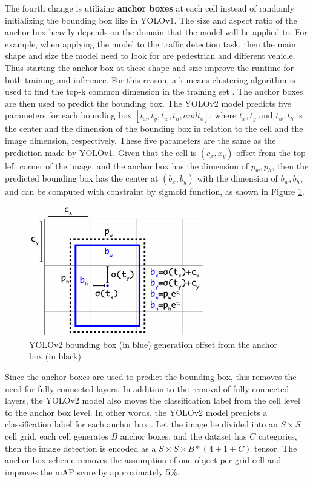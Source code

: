 The fourth change is utilizing \textbf{anchor boxes} at each cell instead of randomly initializing the bounding box like in YOLOv1. The size and aspect ratio of the anchor box heavily depends on the domain that the model will be applied to. For example, when applying the model to the traffic detection task, then the main shape and size the model need to look for are pedestrian and different vehicle. Thus starting the anchor box at these shape and size improve the runtime for both training and inference. For this reason, a k-means clustering algorithm is used to find the top-k common dimension in the training set \cite{yolo9000_2017}. The anchor boxes are then used to predict the bounding box. The YOLOv2 model predicts five parameters for each bounding box $[t_x, t_y, t_w, t_h, and t_o]$, where $t_x, t_y$ and $t_w, t_h$ is the center and the dimension of the bounding box in relation to the cell and the image dimension, respectively. These five parameters are the same as the prediction made by YOLOv1. Given that the cell is $(c_x, x_y)$ offset from the top-left corner of the image, and the anchor box has the dimension of $p_w, p_h$, then the predicted bounding box has the center at $(b_x, b_y)$ with the dimension of $b_w, b_h$, and can be computed with constraint by sigmoid function, as shown in Figure \ref{fig:yolov2_bbox}.

\begin{figure}[!ht]
    \centering
    \includegraphics[width=3in]{figures/yolov2_bbox.png}
    \caption{YOLOv2 bounding box (in blue) generation offset from the anchor box (in black) \cite{yolo9000_2017}} 
    \label{fig:yolov2_bbox}
\end{figure}

Since the anchor boxes are used to predict the bounding box, this removes the need for fully connected layers. In addition to the removal of fully connected layers, the YOLOv2 model also moves the classification label from the cell level to the anchor box level. In other words, the YOLOv2 model predicts a classification label for each anchor box \cite{yolo9000_2017}. Let the image be divided into an $S \times S$ cell grid, each cell generates $B$ anchor boxes, and the dataset has $C$ categories, then the image detection is encoded as a $S \times S \times B*(4+1+C)$ tensor. The anchor box scheme removes the assumption of one object per grid cell and improves the mAP score by approximately 5\%.

